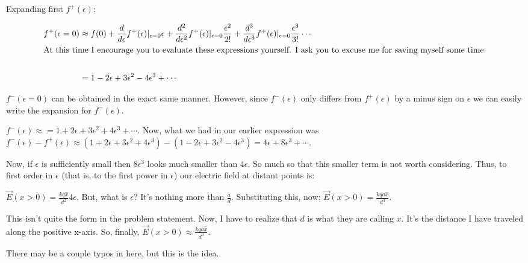 \begin{homeworkProblem}[Problem 23.36]
	Expanding first $f^+(\epsilon)$:

	\begin{align}
		\label{}
		f^+(\epsilon = 0) &\approx f(0) + \frac{d}{d\epsilon}{f^+(\epsilon)}|_{\epsilon=0}\epsilon + \frac{d^2}{d\epsilon^2}{f^+(\epsilon)}|_{\epsilon=0} \frac{\epsilon^2}{2!} + \frac{d^3}{d\epsilon^3}{f^+(\epsilon)}|_{\epsilon=0} \frac{\epsilon^3}{3!} \cdots \nonumber \\
		\intertext{At this time I encourage you to evaluate these expressions yourself. I ask you to excuse me for saving myself some time.} \nonumber \\
		&= 1 - 2\epsilon + 3\epsilon^2 - 4\epsilon^3 + \cdots \nonumber \\
	\end{align}

	$f^-(\epsilon = 0)$ can be obtained in the exact same manner. However, since $f^-(\epsilon)$ only differs from $f^+(\epsilon)$ by a minus sign on $\epsilon$ we can easily write the expansion for $f^-(\epsilon)$.

	$f^-(\epsilon) \approx = 1 + 2\epsilon + 3\epsilon^2 + 4\epsilon^3 + \cdots $. Now, what we had in our earlier expression was $f^-(\epsilon) - f^+(\epsilon) \approx (1 + 2\epsilon + 3\epsilon^2 + 4\epsilon^3) - (1-2\epsilon + 3\epsilon^2 - 4\epsilon^3) = 4\epsilon +8\epsilon^3 + \cdots$. 

	Now, if $\epsilon$ is sufficiently small then $8\epsilon^3$ looks much smaller than $4\epsilon$. So much so that this smaller term is not worth considering. Thus, to first order in $\epsilon$ (that is, to the first power in $\epsilon$) our electric field at distant points is:

	$\vec{E}(x>0) = \frac{k q \hat{x}}{d^2} 4 \epsilon$. But, what is $\epsilon$? It's nothing more than $\frac{a}{d}$. Substituting this, now: $\vec{E}(x>0) = \frac{k q a\hat{x} }{d^3}$.

	This isn't quite the form in the problem statement. Now, I have to realize that $d$ is what they are calling $x$. It's the distance I have traveled along the positive x-axis. So, finally, $\vec{E}(x>0) \approx \frac{k q a \hat{x} }{d^3} $. 

	There may be a couple typos in here, but this is the idea.
\end{homeworkProblem}
